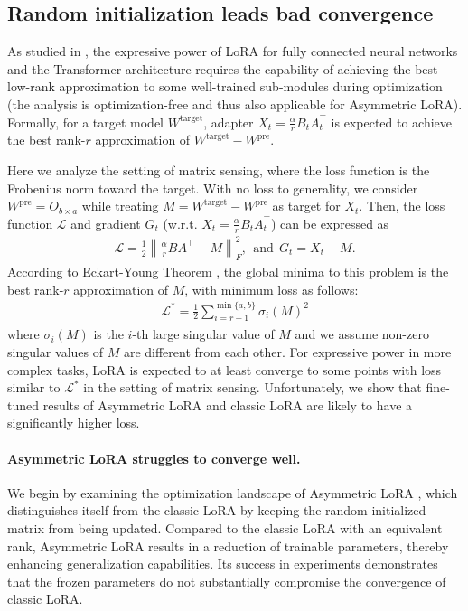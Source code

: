 
\subsection{Random initialization leads bad convergence}
\label{assymetric-bad}

As studied in \cite{zeng2023expressive}, the expressive power of LoRA for fully connected neural networks and the Transformer architecture requires the capability of achieving the best low-rank approximation to some well-trained sub-modules during optimization (the analysis is optimization-free and thus also applicable for Asymmetric LoRA). Formally, for a target model $W^{\operatorname{target}}$, adapter $X_t=\frac{\alpha}{r}B_tA_t^\top$ is expected to achieve the best rank-$r$ approximation of $W^{\operatorname{target}}-W^{\operatorname{pre}}$. 

Here we analyze the setting of matrix sensing, where the loss function is the Frobenius norm toward the target. With no loss to generality, we consider $W^{\operatorname{pre}}=O_{b\times a}$ while treating $M=W^{\operatorname{target}}-W^{\operatorname{pre}}$ as target for $X_t$. Then, the loss function $\mathcal{L}$ and gradient $G_t$ (w.r.t. $X_t=\frac{\alpha}{r}B_tA_t^\top$) can be expressed as
\begin{align}
    \label{matrix-sensing}
    \mathcal{L}=\frac{1}{2}\left\|\frac{\alpha}{r}BA^\top-M\right\|_F^2,~~\text{and}~~G_t=X_t-M.
\end{align}
According to Eckart-Young Theorem \cite{eckart1936approximation}, the global minima to this problem is the best rank-$r$ approximation of $M$, with minimum loss as follows:
\begin{align*}
    \mathcal{L}^*=\frac{1}{2}\sum_{i=r+1}^{\min\{a,b\}}\sigma_i(M)^2
\end{align*}
where $\sigma_i(M)$ is the $i$-th large singular value of $M$ and we assume non-zero singular values of $M$ are different from each other. For expressive power in more complex tasks, LoRA is expected to at least converge to some points with loss similar to $\mathcal{L}^*$ in the setting of matrix sensing. Unfortunately, we show that fine-tuned results of Asymmetric LoRA and classic LoRA are likely to have a significantly higher loss. 

\paragraph{Asymmetric LoRA struggles to converge well.}
We begin by examining the optimization landscape of Asymmetric LoRA \cite{zhu2024asymmetry}, which distinguishes itself from the classic LoRA by keeping the random-initialized matrix from being updated. Compared to the classic LoRA with an equivalent rank, Asymmetric LoRA results in a reduction of trainable parameters, thereby enhancing generalization capabilities. Its success in experiments demonstrates that the frozen parameters do not substantially compromise the convergence of classic LoRA. 

